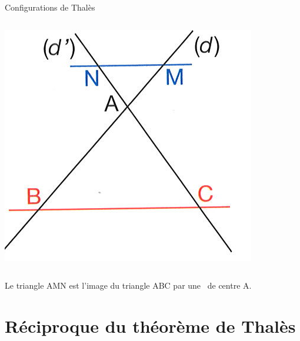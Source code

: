 \documentclass[xcolor={dvipsnames}]{beamer}
\begin{document}
\begin{frame}
\begin{block}{Configurations de Thalès}
\begin{columns}
			\begin{column}{3cm}
				\includegraphics[scale=0.3]{../img/thales1}
			\end{column}
		\end{columns}
		
		Le triangle AMN est l'image du triangle ABC par une \homo\ de centre A.
	\end{block}
\end{frame}


\section{Réciproque du théorème de Thalès}
\end{document}
